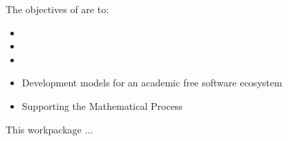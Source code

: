 \addtocounter{wpno}{1}
\begin{Workpackage}{\thewpno}
\WPTitle{\wpname{\thewpno}}


\begin{WPObjectives}
The objectives of \theWP{} are to:
\begin{itemize}
\item
\item
\item
\item Development models for an academic free software ecosystem
\item Supporting the Mathematical Process
\end{itemize}
\end{WPObjectives}

\begin{WPDescription}
This workpackage  ...
\end{WPDescription}


\begin{WPDeliverables}
\end{WPDeliverables}
\end{Workpackage}
